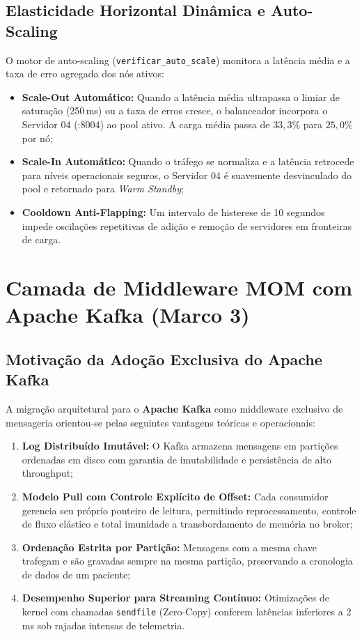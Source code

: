 \documentclass[12pt,a4paper]{article}
\begin{document}
\subsection{Elasticidade Horizontal Dinâmica e Auto-Scaling}
O motor de auto-scaling (\texttt{verificar\_auto\_scale}) monitora a latência média e a taxa de erro agregada dos nós ativos:
\begin{itemize}
	\item \textbf{Scale-Out Automático:} Quando a latência média ultrapassa o limiar de saturação (250\,ms) ou a taxa de erros cresce, o balanceador incorpora o Servidor 04 (:8004) ao pool ativo. A carga média passa de $33{,}3\%$ para $25{,}0\%$ por nó;
	\item \textbf{Scale-In Automático:} Quando o tráfego se normaliza e a latência retrocede para níveis operacionais seguros, o Servidor 04 é suavemente desvinculado do pool e retornado para \textit{Warm Standby};
	\item \textbf{Cooldown Anti-Flapping:} Um intervalo de histerese de 10 segundos impede oscilações repetitivas de adição e remoção de servidores em fronteiras de carga.
\end{itemize}

\section{Camada de Middleware MOM com Apache Kafka (Marco 3)}

\subsection{Motivação da Adoção Exclusiva do Apache Kafka}
A migração arquitetural para o \textbf{Apache Kafka} como middleware exclusivo de mensageria orientou-se pelas seguintes vantagens teóricas e operacionais:
\begin{enumerate}
	\item \textbf{Log Distribuído Imutável:} O Kafka armazena mensagens em partições ordenadas em disco com garantia de imutabilidade e persistência de alto throughput;
	\item \textbf{Modelo Pull com Controle Explícito de Offset:} Cada consumidor gerencia seu próprio ponteiro de leitura, permitindo reprocessamento, controle de fluxo elástico e total imunidade a transbordamento de memória no broker;
	\item \textbf{Ordenação Estrita por Partição:} Mensagens com a mesma chave trafegam e são gravadas sempre na mesma partição, preservando a cronologia de dados de um paciente;
	\item \textbf{Desempenho Superior para Streaming Contínuo:} Otimizações de kernel com chamadas \texttt{sendfile} (Zero-Copy) conferem latências inferiores a 2\,ms sob rajadas intensas de telemetria.
\end{enumerate}
\end{document}
